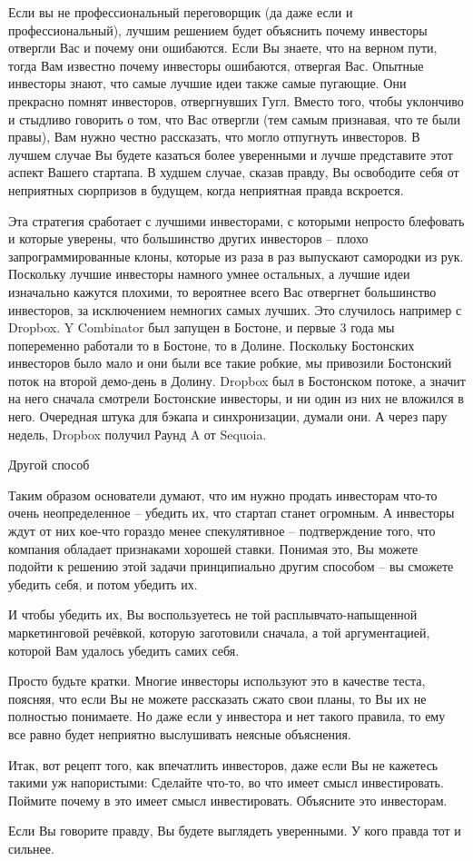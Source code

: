 \documentclass[ebook,12pt,oneside,openany]{memoir}
\begin{document}
Если вы не профессиональный переговорщик (да даже если и
профессиональный), лучшим решением будет объяснить почему инвесторы
отвергли Вас и почему они ошибаются. Если Вы знаете, что на верном
пути, тогда Вам известно почему инвесторы ошибаются, отвергая Вас.
Опытные инвесторы знают, что самые лучшие идеи также самые пугающие.
Они прекрасно помнят инвесторов, отвергнувших Гугл. Вместо того, чтобы
уклончиво и стыдливо говорить о том, что Вас отвергли (тем самым
признавая, что те были правы), Вам нужно честно рассказать, что могло
отпугнуть инвесторов. В лучшем случае Вы будете казаться более
уверенными и лучше представите этот аспект Вашего стартапа. В худшем
случае, сказав правду, Вы освободите себя от неприятных сюрпризов в
будущем, когда неприятная правда вскроется.

Эта стратегия сработает с лучшими инвесторами, с которыми непросто
блефовать и которые уверены, что большинство других инвесторов – плохо
запрограммированные клоны, которые из раза в раз выпускают самородки
из рук. Поскольку лучшие инвесторы намного умнее остальных, а лучшие
идеи изначально кажутся плохими, то вероятнее всего Вас отвергнет
большинство инвесторов, за исключением немногих самых лучших. Это
случилось например с Dropbox. Y Combinator был запущен в Бостоне, и
первые 3 года мы попеременно работали то в Бостоне, то в Долине.
Поскольку Бостонских инвесторов было мало и они были все такие робкие,
мы привозили Бостонский поток на второй демо-день в Долину. Dropbox
был в Бостонском потоке, а значит на него сначала смотрели Бостонские
инвесторы, и ни один из них не вложился в него. Очередная штука для
бэкапа и синхронизации, думали они. А через пару недель, Dropbox
получил Раунд A от Sequoia.

Другой способ

Таким образом основатели думают, что им нужно продать инвесторам
что-то очень неопределенное – убедить их, что стартап станет огромным.
А инвесторы ждут от них кое-что гораздо менее спекулятивное –
подтверждение того, что компания обладает признаками хорошей ставки.
Понимая это, Вы можете подойти к решению этой задачи принципиально
другим способом – вы сможете убедить себя, и потом убедить их.

И чтобы убедить их, Вы воспользуетесь не той расплывчато-напыщенной
маркетинговой речёвкой, которую заготовили сначала, а той
аргументацией, которой Вам удалось убедить самих себя.

Просто будьте кратки. Многие инвесторы используют это в качестве
теста, поясняя, что если Вы не можете рассказать сжато свои планы, то
Вы их не полностью понимаете. Но даже если у инвестора и нет такого
правила, то ему все равно будет неприятно выслушивать неясные
объяснения.

Итак, вот рецепт того, как впечатлить инвесторов, даже если Вы не
кажетесь такими уж напористыми: Сделайте что-то, во что имеет смысл
инвестировать. Поймите почему в это имеет смысл инвестировать.
Объясните это инвесторам.


Если Вы говорите правду, Вы будете выглядеть уверенными. У кого правда
тот и сильнее.
\end{document}
